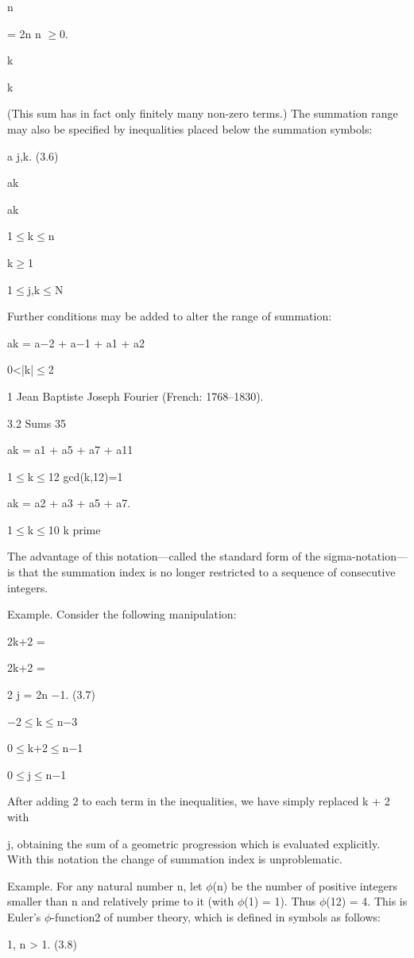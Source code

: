\documentclass[11pt]{article}
\theoremstyle{plain}
\theoremstyle{definition}
\begin{document}
n

= 2n n $\geq$0.

k

k

(This sum has in fact only finitely many non-zero terms.) The summation range may also be specified by inequalities placed below the summation symbols:

a j,k. (3.6)

ak

ak

1$\leq$k$\leq$n

k$\geq$1

1$\leq$j,k$\leq$N

Further conditions may be added to alter the range of summation:

ak = a$-$2 + a$-$1 + a1 + a2

0<|k|$\leq$2

1 Jean Baptiste Joseph Fourier (French: 1768--1830).

3.2 Sums 35

ak = a1 + a5 + a7 + a11

1$\leq$k$\leq$12 gcd(k,12)=1

ak = a2 + a3 + a5 + a7.

1$\leq$k$\leq$10 k prime

The advantage of this notation---called the standard form of the sigma-notation---is that the summation index is no longer restricted to a sequence of consecutive integers.

Example. Consider the following manipulation:

2k+2 =

2k+2 =

2 j = 2n $-$1. (3.7)

$-$2$\leq$k$\leq$n$-$3

0$\leq$k+2$\leq$n$-$1

0$\leq$j$\leq$n$-$1

After adding 2 to each term in the inequalities, we have simply replaced k + 2 with

j, obtaining the sum of a geometric progression which is evaluated explicitly. With this notation the change of summation index is unproblematic.

Example. For any natural number n, let $\phi$(n) be the number of positive integers smaller than n and relatively prime to it (with $\phi$(1) = 1). Thus $\phi$(12) = 4. This is Euler's $\phi$-function2 of number theory, which is defined in symbols as follows:

1, n > 1. (3.8)
\end{document}
